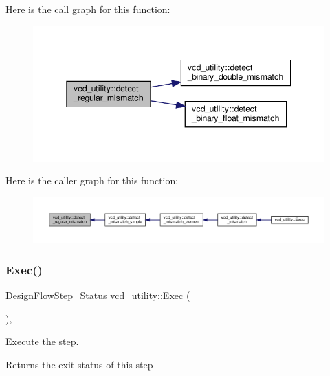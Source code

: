 Here is the call graph for this function\+:
\nopagebreak
\begin{figure}[H]
\begin{center}
\leavevmode
\includegraphics[width=345pt]{d8/d51/classvcd__utility_ad2ab80e69aace43ba9a0d7881880cd1b_cgraph}
\end{center}
\end{figure}
Here is the caller graph for this function\+:
\nopagebreak
\begin{figure}[H]
\begin{center}
\leavevmode
\includegraphics[width=350pt]{d8/d51/classvcd__utility_ad2ab80e69aace43ba9a0d7881880cd1b_icgraph}
\end{center}
\end{figure}
\mbox{\label{classvcd__utility_ad6098cc9cf2ed44a6ae34f9b896760dd}} 
\subsubsection{\texorpdfstring{Exec()}{Exec()}}
{\footnotesize\ttfamily \hyperlink{design__flow__step_8hpp_afb1f0d73069c26076b8d31dbc8ebecdf}{Design\+Flow\+Step\+\_\+\+Status} vcd\+\_\+utility\+::\+Exec (\begin{DoxyParamCaption}{ }\end{DoxyParamCaption})\hspace{0.3cm}{\ttfamily [override]}, {\ttfamily [virtual]}}



Execute the step. 

\begin{DoxyReturn}{Returns}
the exit status of this step 
\end{DoxyReturn}


